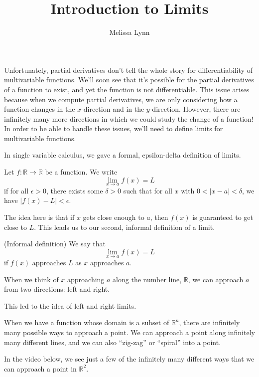 \documentclass{ximera}
\title{Introduction to Limits}
\author{Melissa Lynn}
\begin{document}
\begin{abstract}
\end{abstract}
\maketitle

Unfortunately, partial derivatives don't tell the whole story for differentiability of multivariable functions. We'll soon see that it's possible for the partial derivatives of a function to exist, and yet the function is not differentiable. This issue arises because when we compute partial derivatives, we are only considering how a function changes in the $x$-direction and in the $y$-direction. However, there are infinitely many more directions in which we could study the change of a function! In order to be able to handle these issues, we'll need to define limits for multivariable functions.

In single variable calculus, we gave a formal, epsilon-delta definition of limits.

\begin{definition}
Let $f:\mathbb{R}\rightarrow\mathbb{R}$ be a function. We write
\[
\lim_{x\rightarrow a} f(x) = L
\]
if for all $\epsilon >0$, there exists some $\delta >0$ such that for all $x$ with $0 < |x-a| < \delta$, we have $|f(x)-L| < \epsilon$.
\end{definition}

The idea here is that if $x$ gets close enough to $a$, then $f(x)$ is guaranteed to get close to $L$. This leads us to our second, informal definition of a limit.

\begin{definition}
(Informal definition) We say that
\[
\lim_{x\rightarrow a} f(x) = L
\]
if $f(x)$ approaches $L$ as $x$ approaches $a$.
\end{definition}

When we think of $x$ approaching $a$ along the number line, $\mathbb{R}$, we can approach $a$ from two directions: left and right.


This led to the idea of left and right limits.

When we have a function whose domain is a subset of $\mathbb{R}^n$, there are infinitely many possible ways to approach a point. We can approach a point along infinitely many different lines, and we can also ``zig-zag'' or ``spiral'' into a point.

In the video below, we see just a few of the infinitely many different ways that we can approach a point in $\mathbb{R}^2$.
\end{document}
